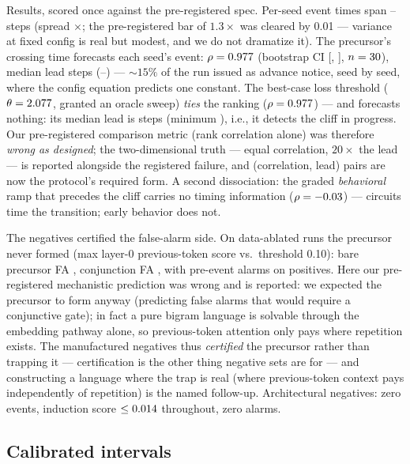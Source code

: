\documentclass[11pt]{article}
\begin{document}
Results, scored once against the pre-registered spec. Per-seed event times span
\wEventMin--\wEventMax{} steps (spread \wSpread$\times$; the pre-registered bar of
$1.3\times$ was cleared by 0.01 --- variance at fixed config is real but modest, and we
do not dramatize it). The precursor's crossing time forecasts each seed's event:
$\rho = 0.977$ (bootstrap CI [\wRhoCIlo, \wRhoCIhi], $n=30$), median lead
\wLeadMed{} steps (\wLeadMin--\wLeadMax) --- ${\sim}15\%$ of the run issued as advance
notice, seed by seed, where the config equation predicts one constant. The best-case
loss threshold ($\theta = 2.077$, granted an oracle sweep) \emph{ties} the
ranking ($\rho=0.977$) --- and forecasts nothing: its median lead is
\wLossLeadMed{} steps (minimum \wLossLeadMin), i.e., it detects the cliff in progress.
Our pre-registered comparison metric (rank correlation alone) was therefore
\emph{wrong as designed}; the two-dimensional truth --- equal correlation, $20\times$
the lead --- is reported alongside the registered failure, and (correlation, lead)
pairs are now the protocol's required form. A second dissociation: the graded
\emph{behavioral} ramp that precedes the cliff carries no timing information
($\rho = -0.03$) --- circuits time the transition; early behavior does not.

The negatives certified the false-alarm side. On data-ablated runs the precursor never
formed (max layer-0 previous-token score \wNorepPvRange{} vs.\ threshold 0.10): bare
precursor FA \wBareFA, conjunction FA \wConjFA, with pre-event alarms on \wConjPre{}
positives. Here our pre-registered mechanistic prediction was wrong and is reported:
we expected the precursor to form anyway (predicting false alarms that would require a
conjunctive gate); in fact a pure bigram language is solvable through the embedding
pathway alone, so previous-token attention only pays where repetition exists. The
manufactured negatives thus \emph{certified} the precursor rather than trapping it ---
certification is the other thing negative sets are for --- and constructing a language
where the trap is real (where previous-token context pays independently of repetition)
is the named follow-up. Architectural negatives: zero events, induction score
$\leq 0.014$ throughout, zero alarms.

\subsection{Calibrated intervals}
\label{sec:conformal}
\end{document}
